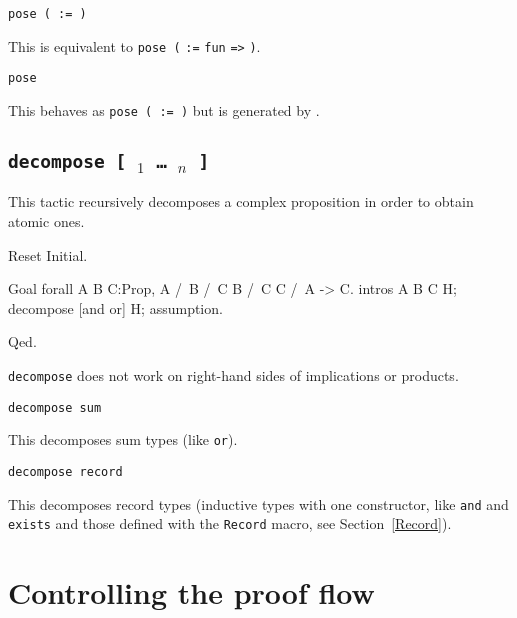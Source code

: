 \begin{coq_example*}
\begin{Variants}
\item {\tt pose ( {\ident} \nelistnosep{\binder} := {\term} )}

  This is equivalent to {\tt pose (} {\ident} {\tt :=} {\tt fun}
  \nelistnosep{\binder} {\tt =>} {\term} {\tt )}.

\item{\tt pose {\term}}

  This behaves as {\tt pose ( {\ident} := {\term} )} but
  {\ident} is generated by {\Coq}.

\end{Variants}

\subsection{\tt decompose [ {\qualid$_1$} \dots\ {\qualid$_n$} ] \term}
\label{decompose}

This tactic recursively decomposes a
complex proposition in order to obtain atomic ones.

\Example

\begin{coq_eval}
Reset Initial.
\end{coq_eval}
\begin{coq_example}
Goal forall A B C:Prop, A /\ B /\ C \/ B /\ C \/ C /\ A -> C.
intros A B C H; decompose [and or] H; assumption.
\end{coq_example}
\begin{coq_example*}
Qed.
\end{coq_example*}

{\tt decompose} does not work on right-hand sides of implications or products.

\begin{Variants}

\item {\tt decompose sum \term}

  This decomposes sum types (like \texttt{or}).

\item {\tt decompose record \term}

  This decomposes record types (inductive types with one constructor,
  like \texttt{and} and \texttt{exists} and those defined with the
  \texttt{Record} macro, see Section~\ref{Record}).

\end{Variants}

\section{Controlling the proof flow}


\end{coq_example*}
